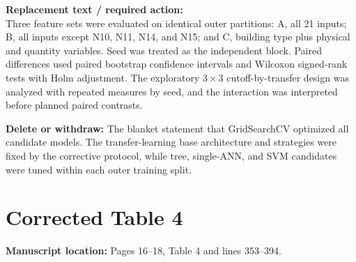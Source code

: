 \documentclass[10pt]{article}
\newcommand{\loc}[1]{\textbf{Manuscript location:} #1}
\newcommand{\replacewith}[1]{\textbf{Replacement text / required action:}\\{\color{revisionblue}#1}}
\newcommand{\deleteitem}[1]{\textbf{Delete or withdraw:} {\color{deleteRed}#1}}
\begin{document}
\replacewith{Three feature sets were evaluated on identical outer partitions: A, all 21 inputs; B, all inputs except N10, N11, N14, and N15; and C, building type plus physical and quantity variables. Seed was treated as the independent block. Paired differences used paired bootstrap confidence intervals and Wilcoxon signed-rank tests with Holm adjustment. The exploratory $3\times3$ cutoff-by-transfer design was analyzed with repeated measures by seed, and the interaction was interpreted before planned paired contrasts.}

\deleteitem{The blanket statement that GridSearchCV optimized all candidate models. The transfer-learning base architecture and strategies were fixed by the corrective protocol, while tree, single-ANN, and SVM candidates were tuned within each outer training split.}

\section{Corrected Table 4}

\loc{Pages 16--18, Table 4 and lines 353--394.}
\end{document}
